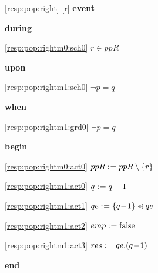 \noindent \ref{resp:pop:right} [r] \textbf{event}
\begin{block}
  \item   \textbf{during}
  \begin{block}
  \item[ \eqref{resp:pop:rightm0:sch0} ]{$r \in ppR $} %
  \end{block}
  \item   \textbf{upon}
  \begin{block}
  \item[ \eqref{resp:pop:rightm1:sch0} ]{$\neg p = q$} %
  \end{block}
  \item   \textbf{when}
  \begin{block}
  \item[ \eqref{resp:pop:rightm1:grd0} ]{$\neg p = q$} %
  \end{block}
  \item   \textbf{begin}
  \begin{block}
  \item[ \eqref{resp:pop:rightm0:act0} ]{$ppR \mathrel{:\mkern1mu=} ppR \setminus \{ r \} $} %
  \item[ \eqref{resp:pop:rightm1:act0} ]{$q \mathrel{:\mkern1mu=} q-1$} %
  \item[ \eqref{resp:pop:rightm1:act1} ]{$qe \mathrel{:\mkern1mu=} \{ q\! - \!1 \} \mathbin{\lhd\mkern-14mu-} qe $} %
  \item[ \eqref{resp:pop:rightm1:act2} ]{$emp \mathrel{:\mkern1mu=} \text{false} $} %
  \item[ \eqref{resp:pop:rightm1:act3} ]{$res \mathrel{:\mkern1mu=} qe.(q\! - \!1) $} %
  \end{block}
  \item   \textbf{end} \\
\end{block}
